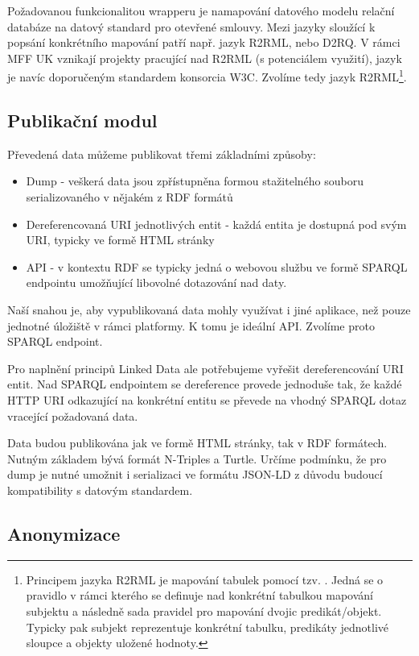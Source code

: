 Požadovanou funkcionalitou wrapperu je namapování datového modelu relační databáze na datový standard pro otevřené smlouvy. Mezi jazyky sloužící k popsání konkrétního mapování patří např. jazyk R2RML\cite{R2RML}, nebo D2RQ\cite{D2RQ}. V rámci MFF UK vznikají projekty pracující nad R2RML (s potenciálem využití), jazyk je navíc doporučeným standardem konsorcia W3C. Zvolíme tedy jazyk R2RML\footnote{Principem jazyka R2RML je mapování tabulek pomocí tzv. . Jedná se o pravidlo v rámci kterého se definuje nad konkrétní tabulkou mapování subjektu a následně sada pravidel pro mapování dvojic predikát/objekt. Typicky pak subjekt reprezentuje konkrétní tabulku, predikáty jednotlivé sloupce a objekty uložené hodnoty.\cite{R2RML} }.

\subsection*{Publikační modul}

Převedená data můžeme publikovat třemi základními způsoby:

\begin{itemize}
\item Dump - veškerá data jsou zpřístupněna formou stažitelného souboru serializovaného v nějakém z RDF formátů
\item Dereferencovaná URI jednotlivých entit - každá entita je dostupná pod svým URI, typicky ve formě HTML stránky
\item API - v kontextu RDF se typicky jedná o webovou službu ve formě SPARQL endpointu umožňující libovolné dotazování nad daty.
\end{itemize}

Naší snahou je, aby vypublikovaná data mohly využívat i jiné aplikace, než pouze jednotné úložiště v rámci platformy. K tomu je ideální API. Zvolíme proto SPARQL endpoint.

Pro naplnění principů Linked Data ale potřebujeme vyřešit dereferencování URI entit. Nad SPARQL endpointem se dereference provede jednoduše tak, že každé HTTP URI odkazující na konkrétní entitu se převede na vhodný SPARQL dotaz vracející požadovaná data. 

Data budou publikována jak ve formě HTML stránky, tak v RDF formátech. Nutným základem bývá formát N-Triples a Turtle. Určíme podmínku, že pro dump je nutné umožnit i serializaci ve formátu JSON-LD z důvodu budoucí kompatibility s datovým standardem.

\subsection*{Anonymizace} 

